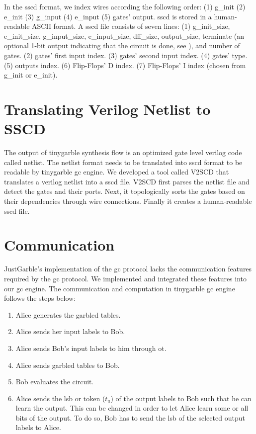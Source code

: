 In the \acrshort{sscd} format, we index wires according the following order: (1) g\_init (2) e\_init (3) g\_input (4) e\_input (5) gates' output.
\acrshort{sscd} is stored in a human-readable ASCII format.
A \acrshort{sscd} file consists of seven lines: (1) g\_init\_size, e\_init\_size, g\_input\_size, e\_input\_size, dff\_size, output\_size, terminate (an optional 1-bit output indicating that the circuit is done, see ), and number of gates. (2) gates' first input index. (3) gates' second input index. (4) gates' type. (5) outputs index. (6) Flip-Flops' D index. (7) Flip-Flops' I index (chosen from g\_init or e\_init).

\section{Translating Verilog Netlist to SSCD}\label{sec:engine-v2sscd}
The output of \gls{tinygarble} synthesis flow is an optimized gate level \gls{verilog} code called \gls{netlist}.
The \gls{netlist} format needs to be translated into \acrshort{sscd} format to be readable by \gls{tinygarble} \acrshort{gc} engine.
We developed a tool called V2SCD that translates a \gls{verilog} \gls{netlist} into a \acrshort{sscd} file.
V2SCD first parses the \gls{netlist} file and detect the gates and their ports.
Next, it topologically sorts the gates based on their dependencies through wire connections.
Finally it creates a human-readable \acrshort{sscd} file.

\section{Communication}\label{sec:engine-comm}
JustGarble's implementation of the \acrshort{gc} protocol lacks the communication features required by the \acrshort{gc} protocol.
We implemented and integrated these features into our \acrshort{gc} engine.
The communication and computation in \gls{tinygarble} \acrshort{gc} engine follows the steps below:
\begin{enumerate}
\item Alice generates the garbled tables.
\item Alice sends her input labels to Bob.
\item Alice sends Bob's input labels to him through \acrshort{ot}.
\item Alice sends garbled tables to Bob.
\item Bob evaluates the circuit.
\item Alice sends the \acrfull{lsb} or token (${t}_a$) of the output labels to Bob such that he can learn the output.
  This can be changed in order to let Alice learn some or all bits of the output.
  To do so, Bob has to send the \acrshort{lsb} of the selected output labels to Alice.
\end{enumerate}

